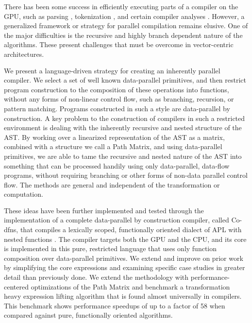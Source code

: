 ﻿\documentclass[numbers,10pt,preprint]{sigplanconf}
\begin{document}
There has been some success in efficiently executing parts of a compiler on the GPU, such as parsing \cite{bunda1984apl}, tokenization \cite{bernecky2003tokenizer}, and certain compiler analyses \cite{prabhu2011eigencfa,mendez2012inclusion}. However, a generalized framework or strategy for parallel compilation remains elusive. One of the major difficulties is the recursive and highly branch dependent nature of the algorithms. These present challenges that must be overcome in vector-centric architectures.

We present a language-driven strategy for creating an inherently parallel compiler. We select a set of well known data-parallel primitives, and then restrict program construction to the composition of these operations into functions, without any forms of non-linear control flow, such as branching, recursion, or pattern matching. Programs constructed in such a style are data-parallel by construction. A key problem to the construction of compilers in such a restricted environment is dealing with the inherently recursive and nested structure of the AST. By working over a linearized representation of the AST as a matrix, combined with a structure we call a Path Matrix, and using data-parallel primitives, we are able to tame the recursive and nested nature of the AST into something that can be processed handily using only data-parallel, data-flow programs, without requiring branching or other forms of non-data parallel control flow. The methods are general and independent of the transformation or computation.

These ideas have been further implemented and tested through the implementation of a complete data-parallel by construction compiler, called Co-dfns, that compiles a lexically scoped, functionally oriented dialect of APL with nested functions \cite{hsu2014co,hsu2015accelerating}. The compiler targets both the GPU and the CPU, and its core is implemented in this pure, restricted language that uses only function composition over data-parallel primitives. We extend and improve on prior work \cite{hsu2016key} by simplifying the core expressions and examining specific case studies in greater detail than previously done. We extend the methodology with performance-centered optimizations of the Path Matrix and benchmark a transformation heavy expression lifting algorithm that is found almost universally in compilers. This benchmark shows performance speedups of up to a factor of 58 when compared against pure, functionally oriented algorithms.
\end{document}
